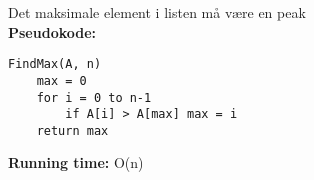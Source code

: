 Det maksimale element i listen må være en peak\\
\textbf{Pseudokode:}
\begin{lstlisting}[frame=single, mathescape=true]
FindMax(A, n)
	max = 0
	for i = 0 to n-1
		if A[i] > A[max] max = i
	return max
\end{lstlisting}
\textbf{Running time:} O(n)
